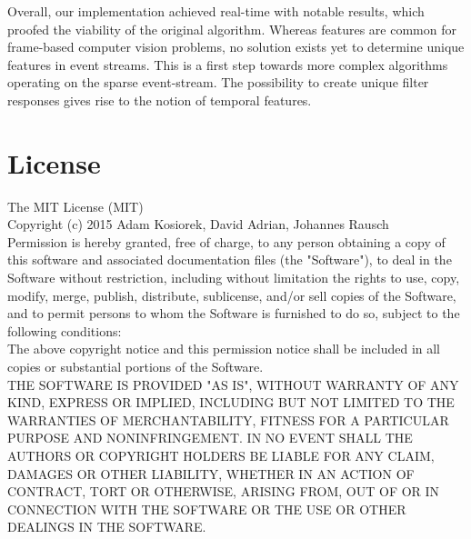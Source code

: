 \documentclass[a4paper,twoside, openright,12pt]{report}
\begin{document}
Overall, our implementation achieved real-time with notable results, which proofed the viability of the original algorithm.
Whereas features are common for frame-based computer vision problems, no solution exists yet to determine unique features in event streams.
This is a first step towards more complex algorithms operating on the sparse event-stream.
The possibility to create unique filter responses gives rise to the notion of temporal features.







\cleardoublepage
{}
\listoffigures 	 %


\cleardoublepage
{}




\cleardoublepage
\chapter*{License}
The MIT License (MIT)\\

Copyright (c) 2015 Adam Kosiorek, David Adrian, Johannes Rausch\\

Permission is hereby granted, free of charge, to any person obtaining a copy of this software and associated documentation files (the "Software"), to deal in the Software without restriction, including without limitation the rights to use, copy, modify, merge, publish, distribute, sublicense, and/or sell copies of the Software, and to permit persons to whom the Software is furnished to do so, subject to the following conditions:\\

The above copyright notice and this permission notice shall be included in all copies or substantial portions of the Software.\\

THE SOFTWARE IS PROVIDED "AS IS", WITHOUT WARRANTY OF ANY KIND, EXPRESS OR IMPLIED, INCLUDING BUT NOT LIMITED TO THE WARRANTIES OF MERCHANTABILITY, FITNESS FOR A PARTICULAR PURPOSE AND NONINFRINGEMENT. IN NO EVENT SHALL THE AUTHORS OR COPYRIGHT HOLDERS BE LIABLE FOR ANY CLAIM, DAMAGES OR OTHER LIABILITY, WHETHER IN AN ACTION OF CONTRACT, TORT OR OTHERWISE, ARISING FROM, OUT OF OR IN CONNECTION WITH THE SOFTWARE OR THE USE OR OTHER DEALINGS IN THE SOFTWARE.
\end{document}
